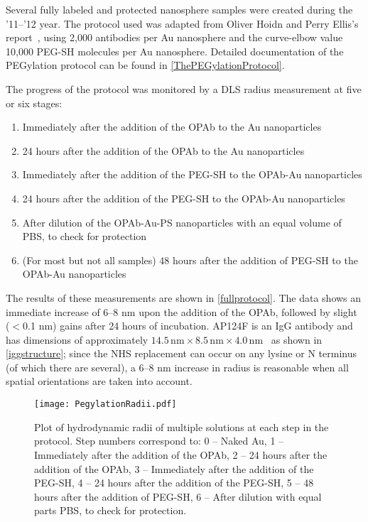 Several fully labeled and protected nanosphere samples were created during the '11--'12 year. The protocol used was adapted from Oliver Hoidn and Perry Ellis's report~\citep{hoidnellis}, using 2,000 antibodies per Au nanosphere and the curve-elbow value 10,000 PEG-SH molecules per Au nanosphere. Detailed documentation of the PEGylation protocol can be found in \autoref{ThePEGylationProtocol}.

The progress of the protocol was monitored by a DLS radius measurement at five or six stages:

\begin{enumerate}
\item Immediately after the addition of the OPAb to the Au nanoparticles

\item 24 hours after the addition of the OPAb to the Au nanoparticles

\item Immediately after the addition of the PEG-SH to the OPAb-Au nanoparticles

\item 24 hours after the addition of the PEG-SH to the OPAb-Au nanoparticles

\item After dilution of the OPAb-Au-PS nanoparticles with an equal volume of PBS, to check for protection

\item (For most but not all samples) 48 hours after the addition of PEG-SH to the OPAb-Au nanoparticles

\end{enumerate}

The results of these measurements are shown in \autoref{fullprotocol}. The data shows an immediate increase of 6--8 nm upon the addition of the OPAb, followed by slight ($<$0.1 nm) gains after 24 hours of incubation. AP124F is an IgG antibody and has dimensions of approximately $14.5\mathrm{\,nm}\times8.5\mathrm{\,nm}\times4.0\mathrm{\,nm}$~\citep{antibodylength} as shown in \autoref{iggstructure};
since the NHS replacement can occur on any lysine or N terminus (of which there are several), a 6--8 nm increase in radius is reasonable when all spatial orientations are taken into account.

\begin{figure}[htbp]
\centering
\texttt{[image: PegylationRadii.pdf]}
\caption{Plot of hydrodynamic radii of multiple solutions at each step in the protocol. Step numbers correspond to: 0 -- Naked Au, 1 -- Immediately after the addition of the OPAb, 2 -- 24 hours after the addition of the OPAb, 3 -- Immediately after the addition of the PEG-SH, 4 -- 24 hours after the addition of the PEG-SH, 5 -- 48 hours after the addition of PEG-SH, 6 -- After dilution with equal parts PBS, to check for protection.}
\label{fullprotocol}
\end{figure}



